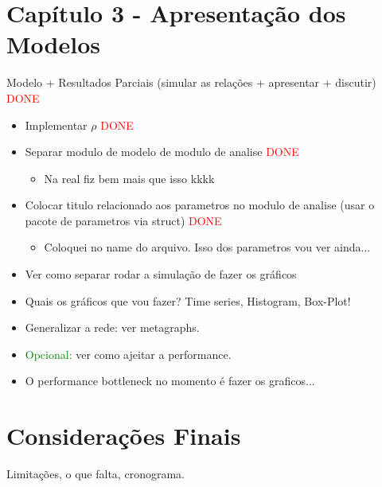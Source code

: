 \documentclass{article}
\begin{document}
\section*{Capítulo 3 - Apresentação dos Modelos}

Modelo + Resultados Parciais (simular as relações + apresentar + discutir)
\textcolor{red}{DONE}



\begin{itemize}
\item Implementar $\rho$ \textcolor{red}{DONE}
\item Separar modulo de modelo de modulo de analise \textcolor{red}{DONE}
  \begin{itemize}
  \item Na real fiz bem mais que isso kkkk
  \end{itemize}

\item Colocar titulo relacionado aos parametros no modulo de analise (usar o
  pacote de parametros via struct) \textcolor{red}{DONE}
  \begin{itemize}
  \item Coloquei no name do arquivo. Isso dos parametros vou ver ainda...
  \end{itemize}

\item Ver como separar rodar a simulação de fazer os gráficos
\item Quais os gráficos que vou fazer? Time series, Histogram, Box-Plot!

\item Generalizar a rede: ver metagraphs.
\item \textcolor{green}{Opcional:} ver como ajeitar a performance.
\item O performance bottleneck no momento é fazer os graficos... 
\end{itemize}




\section*{Considerações Finais}

Limitações, o que falta, cronograma.
\end{document}
